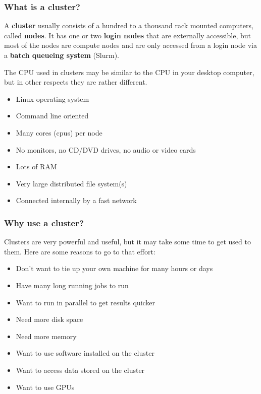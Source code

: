 \documentclass[10pt]{beamer}
\begin{document}
\begin{frame}
\frametitle{What is a cluster?}

A \textbf{cluster} usually consists of a hundred to a thousand rack mounted
computers, called \textbf{nodes}.  It has one or two \textbf{login nodes}
that are externally accessible, but most of the nodes are
compute nodes and are only accessed from a login node via a
\textbf{batch queueing system} (Slurm).

\vskip10pt
The CPU used in clusters may be similar to the CPU in your
desktop computer, but in other respects they are rather different.

\begin{itemize}
\item Linux operating system
\item Command line oriented 
\item Many cores (cpus) per node
\item No monitors, no CD/DVD drives, no audio or video cards
\item Lots of RAM
\item Very large distributed file system(s)
\item Connected internally by a fast network
\end{itemize}
\end{frame}

\begin{frame}
\frametitle{Why use a cluster?}
Clusters are very powerful and useful, but it may take some
time to get used to them.
Here are some reasons to go to that effort:

\begin{itemize}
\item Don't want to tie up your own machine for many hours or days
\item Have many long running jobs to run
\item Want to run in parallel to get results quicker
\item Need more disk space
\item Need more memory
\item Want to use software installed on the cluster
\item Want to access data stored on the cluster
\item Want to use GPUs
\end{itemize}
\end{frame}
\end{document}
